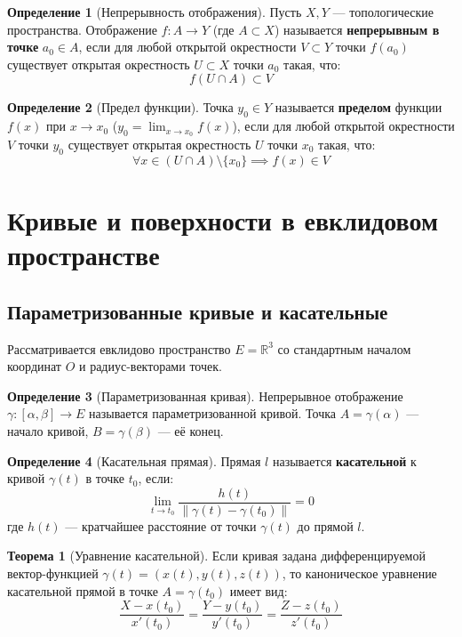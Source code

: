 \documentclass[12pt,a4paper]{article}
\theoremstyle{definition}
\newtheorem{definition}{Определение}[section]
\newtheorem{theorem}{Теорема}[section]
\begin{document}
\begin{definition}[Непрерывность отображения]
Пусть $X, Y$ --- топологические пространства. Отображение $f: A \to Y$ (где $A \subset X$) называется \textbf{непрерывным в точке} $a_0 \in A$, если для любой открытой окрестности $V \subset Y$ точки $f(a_0)$ существует открытая окрестность $U \subset X$ точки $a_0$ такая, что:
$$f(U \cap A) \subset V$$
\end{definition}

\begin{definition}[Предел функции]
Точка $y_0 \in Y$ называется \textbf{пределом} функции $f(x)$ при $x \to x_0$ ($y_0 = \lim_{x \to x_0} f(x)$), если для любой открытой окрестности $V$ точки $y_0$ существует открытая окрестность $U$ точки $x_0$ такая, что:
$$\forall x \in (U \cap A) \setminus \{x_0\} \implies f(x) \in V$$
\end{definition}\section{Кривые и поверхности в евклидовом пространстве}

\subsection{Параметризованные кривые и касательные}

Рассматривается евклидово пространство $E = \mathbb{R}^3$ со стандартным началом координат $O$ и радиус-векторами точек.

\begin{definition}[Параметризованная кривая]
Непрерывное отображение $\gamma: [\alpha, \beta] \to E$ называется параметризованной кривой. Точка $A = \gamma(\alpha)$ --- начало кривой, $B = \gamma(\beta)$ --- её конец.
\end{definition}

\begin{definition}[Касательная прямая]
Прямая $l$ называется \textbf{касательной} к кривой $\gamma(t)$ в точке $t_0$, если:
$$\lim_{t \to t_0} \frac{h(t)}{\|\gamma(t) - \gamma(t_0)\|} = 0$$
где $h(t)$ --- кратчайшее расстояние от точки $\gamma(t)$ до прямой $l$.
\end{definition}

\begin{theorem}[Уравнение касательной]
Если кривая задана дифференцируемой вектор-функцией $\gamma(t) = (x(t), y(t), z(t))$, то каноническое уравнение касательной прямой в точке $A = \gamma(t_0)$ имеет вид:
$$\frac{X - x(t_0)}{x'(t_0)} = \frac{Y - y(t_0)}{y'(t_0)} = \frac{Z - z(t_0)}{z'(t_0)}$$
\end{theorem}
\end{document}
